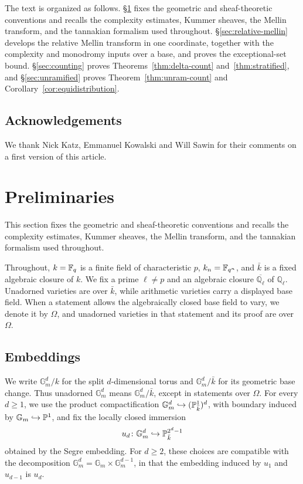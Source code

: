 \documentclass[12pt,reqno]{amsart}
\theoremstyle{definition}
\theoremstyle{plain}
\theoremstyle{definition}
\theoremstyle{remark}
\newcommand{\bbG}{\mathbb{G}}  \newcommand{\bbH}{\mathbb{H}}
\newcommand{\bbQ}{\mathbb{Q}}  \newcommand{\bbR}{\mathbb{R}}
\newcommand{\ol}[1]{\overline{#1}}
\newcommand{\Ql}{\bbQ_{\ell}}
\newcommand{\Gm}{\bbG_m}
\begin{document}
The text is organized as follows. \S\ref{sec:preliminaries} fixes the geometric and sheaf-theoretic conventions and recalls the complexity
estimates, Kummer sheaves, the Mellin transform, and the tannakian formalism used throughout.
\S\ref{sec:relative-mellin}
develops the relative Mellin transform in one coordinate, together with the complexity and
monodromy inputs over a base, and proves the exceptional-set bound.
\S\ref{sec:counting} proves Theorems~\ref{thm:delta-count} and~\ref{thm:stratified}, and
\S\ref{sec:unramified} proves Theorem~\ref{thm:unram-count} and
Corollary~\ref{cor:equidistribution}.

\subsection*{Acknowledgements}

We thank Nick Katz, Emmanuel Kowalski and Will Sawin for their comments on a first version of this
article.

\section{Preliminaries}
\label{sec:preliminaries}

This section fixes the geometric and sheaf-theoretic conventions and recalls the complexity estimates,
Kummer sheaves, the Mellin transform, and the tannakian formalism used throughout.

Throughout, \(k=\mathbb{F}_q\) is a finite field of characteristic \(p\), \(k_n=\mathbb{F}_{q^n}\), and \(\bar k\) is
a fixed algebraic closure of \(k\).  We fix a prime \(\ell\neq p\) and an algebraic closure \(\ol\Ql\) of
\(\mathbb Q_\ell\).  Unadorned varieties are over \(\bar k\), while arithmetic varieties carry a
displayed base field.  When a statement allows the algebraically closed base field to vary, we denote it
by \(\Omega\), and unadorned varieties in that statement and its proof are over \(\Omega\).

\subsection{Embeddings}
\label{sec:embeddings}

We write \(\Gm^d/k\) for the split \(d\)-dimensional torus and \(\Gm^d/\bar k\) for its geometric base
change.  Thus unadorned \(\Gm^d\) means \(\Gm^d/\bar k\), except in statements over \(\Omega\).
For every \(d\ge1\), we use the product compactification
\(\Gm^d\hookrightarrow(\bbP^1_{\bar k})^d\), with boundary induced by
\(\Gm\hookrightarrow\bbP^1\), and fix the locally closed immersion
\[
        u_d\colon \Gm^d\hookrightarrow\bbP^{2^d-1}_{\bar k}
\]
obtained by the Segre embedding.  For \(d\ge2\), these choices are compatible with the decomposition
\(\Gm^d=\Gm\times\Gm^{d-1}\), in that the embedding induced by \(u_1\) and \(u_{d-1}\) is \(u_d\).
\end{document}
